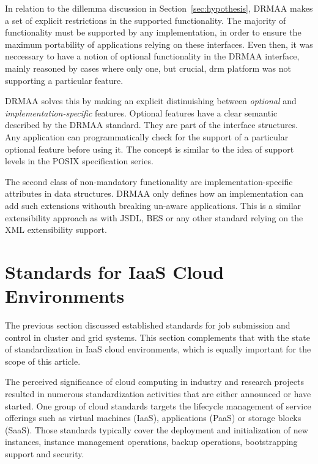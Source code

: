 \documentclass[twocolumn]{svjour3}       %
\begin{document}
In relation to the dillemma discussion in Section~\ref{sec:hypothesis}, DRMAA makes a set of explicit restrictions in the supported functionality. The majority of functionality must be supported by any implementation, in order to ensure the maximum portability of applications relying on these interfaces. Even then, it was neccessary to have a notion of optional functionality in the DRMAA interface, mainly reasoned by cases where only one, but crucial, \gls{drm} platform was not supporting a particular feature. 

DRMAA solves this by making an explicit distinuishing between \emph{optional} and \emph{implementation-specific} features. Optional features have a clear semantic described by the DRMAA standard. They are part of the interface structures. Any application can programmatically check for the support of a particular optional feature before using it. The concept is similar to the idea of support levels in the POSIX specification series.

The second class of non-mandatory functionality are implementation-specific attributes in data structures. DRMAA only defines how an implementation can add such extensions withouth breaking un-aware applications. This is a similar extensibility approach as with JSDL, BES or any other standard relying on the XML extensibility support. 


\section{Standards for IaaS Cloud Environments}
\label{sec:speciaas}

The previous section discussed established standards for job submission and control in cluster and grid systems.  This section complements that with the state of standardization in IaaS cloud environments, which is equally important for the scope of this article.  

The perceived significance of cloud computing in industry and research projects resulted in numerous standardization activities that are either announced or have started.  One group of cloud standards targets the lifecycle management of service offerings such as virtual machines (IaaS), applications (PaaS) or storage blocks (SaaS). Those standards typically cover the deployment and initialization of new instances, instance management operations, backup operations, bootstrapping support and security.

\end{document}
